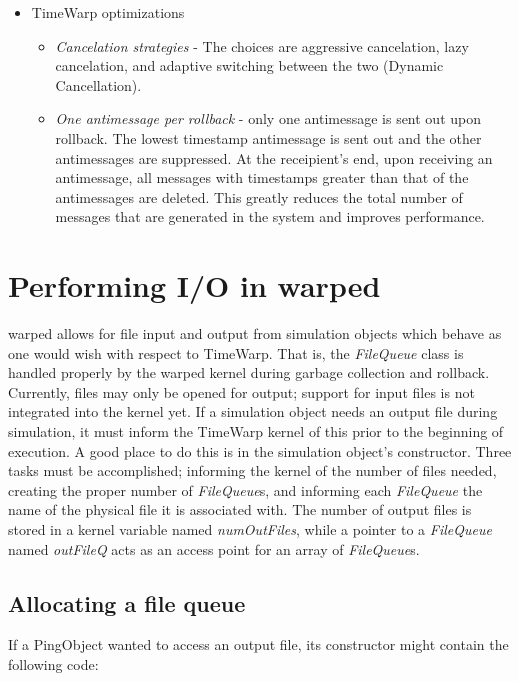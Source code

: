 \documentclass[11pt]{report}
\begin{document}
\begin{itemize}
\item 
TimeWarp optimizations

\begin{itemize}
\item
{\it Cancelation strategies} - The choices are aggressive cancelation,
lazy cancelation, and adaptive switching between the two (Dynamic
Cancellation). 

\item 
{\it One antimessage per rollback} - only one antimessage is sent out upon
rollback. The lowest timestamp antimessage is sent out and the other
antimessages are suppressed. At the receipient's end, upon receiving an
antimessage, all messages with timestamps greater than that of the
antimessages are deleted. This greatly reduces the total number of
messages that are generated in the system and improves performance.

\end{itemize}
\end{itemize}

\section{Performing I/O in {\sc warped}}

{\sc warped} allows for file input and output from simulation objects
which behave as one would wish with respect to TimeWarp.  That is, the
{\it FileQueue} class is handled properly by the {\sc warped} kernel
during garbage collection and rollback.  Currently, files may only be
opened for output; support for input files is not integrated into the
kernel yet.  If a simulation object needs an output file during
simulation, it must inform the TimeWarp kernel of this prior to the
beginning of execution.  A good place to do this is in the simulation
object's constructor.  Three tasks must be accomplished; informing the
kernel of the number of files needed, creating the proper number of {\it
FileQueue}s, and informing each {\it FileQueue} the name of the physical
file it is associated with.  The number of output files is stored in a
kernel variable named {\it numOutFiles}, while a pointer to a {\it
FileQueue} named {\it outFileQ} acts as an access point for an array of
{\it FileQueue}s.

\subsection{Allocating a file queue}

If a PingObject wanted to access an output file, its constructor might
contain the following code:
\end{document}
